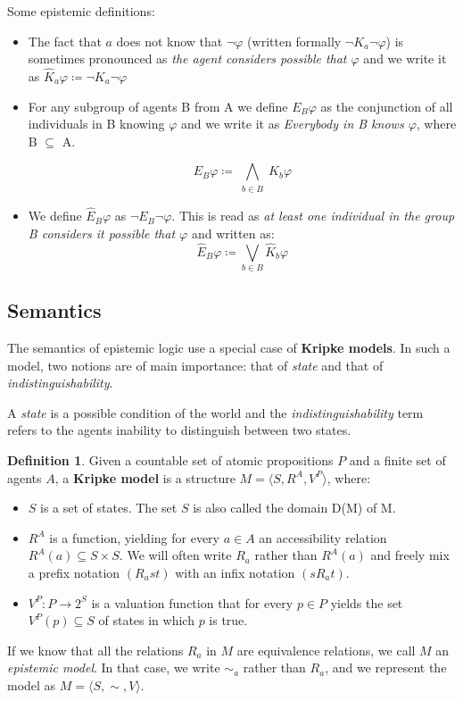\documentclass[12pt]{article}
\numberwithin{equation}{section}
\theoremstyle{definition}
\theoremstyle{definition}
\newtheorem{defn}[thm]{Definition}
\theoremstyle{remark}
\begin{document}
Some epistemic definitions:
\begin{itemize}
  \item The fact that $a$ does not know that $\neg\varphi$ (written formally $\neg K_a \neg\varphi$) is sometimes pronounced as
\textit{the agent considers possible that $\varphi$} and we write it as $\hat{K}_a\varphi \coloneqq \neg K_a \neg\varphi$
  \item For any subgroup of agents B from A we define $E_B\varphi$ as the conjunction of all individuals in B knowing $\varphi$ and we write it as \textit{Everybody in B knows $\varphi$},
  where B $\subseteq$ A.
  
  $$
  E_B\varphi \coloneqq \bigwedge_{\substack{
   b\in B
  }} 
  K_b\varphi
  $$
 
 \item We define $\hat{E}_B\varphi$ as $\neg E_B \neg \varphi$. This is read as \textit{at least one individual in the group B considers it possible that $\varphi$} and written as:  
 $$
  \hat E_B \varphi \coloneqq \bigvee_{b \in B} \hat{K}_b\varphi
 $$
\end{itemize}


\subsection{Semantics}

The semantics of epistemic logic use a special case of \textbf{Kripke models}. In such a model, two notions are of main importance: that of \textit{state} and that of \textit{indistinguishability}.

A \textit{state} is a possible condition of the world and the \textit{indistinguishability} term refers to the agents inability to distinguish between two states. 

\begin{defn}

Given a countable set of atomic propositions $P$ and a finite
set of agents $A$, a \textbf{Kripke model} is a structure $M = \langle S,R^A, V^P \rangle$, where:
\begin{itemize}

\item $S$ is a set of states. The set $S$ is also called the domain D(M) of M.
\item $R^A$ is a function, yielding for every $a \in A$ an accessibility relation $R^A(a)\subseteq S \times S$. We will often write $R_a$ rather than $R^A(a)$ and freely mix a prefix notation $(R_a st)$ with an infix notation $(sR_a t)$.
\item $V^P : P \rightarrow 2^S$ is a valuation function that for every $p \in P$ yields the set
$V^P (p) \subseteq S$ of states in which $p$ is true.
\end{itemize}

If we know that all the relations $R_a$ in $M$ are equivalence relations, we call $M$ an \textit{epistemic model}. In that case, we write $\sim _a$ rather than $R_a$, and we represent the model as $M = \langle S, \sim, V \rangle$.

\end{defn}
\end{document}
